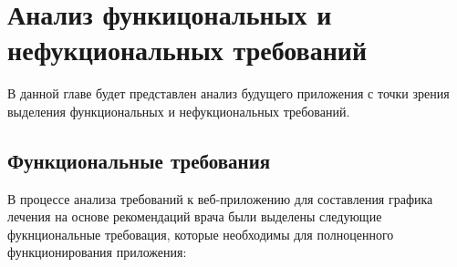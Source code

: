 \documentclass[14pt]{extreport}
\begin{document}
\chapter{Анализ функицональных и нефукциональных требований}
    В данной главе будет представлен анализ будущего приложения %
    с точки зрения выделения функциональных и нефукциональных требований.
    \section{Функциональные требования}
        В процессе анализа требований к веб-приложению для %
        составления графика лечения на основе рекомендаций врача были выделены %
        следующие фукнциональные требовация, которые необходимы для полноценного %
        функционирования приложения:
        \newline
\end{document}
